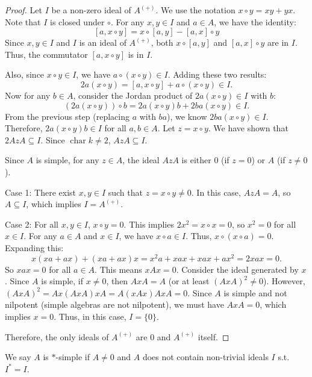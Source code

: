 \documentclass{article}
\begin{document}
\begin{proof} 
Let $ I $ be a non-zero ideal of $ A^{(+)} $. We use the notation $ x \circ y = xy + yx $. Note that $ I $ is closed under $\circ$.
For any $ x,y \in I $ and $ a \in A $, we have the identity:
\[
[a, x \circ y] = x \circ [a, y] - [a, x] \circ y
\]
Since $ x, y \in I $ and $ I $ is an ideal of $ A^{(+)} $, both $ x \circ [a, y] $ and $ [a, x] \circ y $ are in $ I $. Thus, the commutator $ [a, x \circ y] $ is in $ I $.

Also, since $ x \circ y \in I $, we have $ a \circ (x \circ y) \in I $. Adding these two results:
\[
2a(x \circ y) = [a, x \circ y] + a \circ (x \circ y) \in I.
\]
Now for any $ b \in A $, consider the Jordan product of $ 2a(x \circ y) \in I $ with $ b $:
\[
(2a(x \circ y)) \circ b = 2a(x \circ y)b + 2b a (x \circ y) \in I.
\]
From the previous step (replacing $ a $ with $ ba $), we know $ 2ba(x \circ y) \in I $.
Therefore, $ 2a(x \circ y)b \in I $ for all $ a, b \in A $.
Let $ z = x \circ y $. We have shown that $ 2 A z A \subseteq I $. Since $ \operatorname{char} k \neq 2 $, $ A z A \subseteq I $.

Since $ A $ is simple, for any $ z \in A $, the ideal $ A z A $ is either $ 0 $ (if $ z=0 $) or $ A $ (if $ z \neq 0 $).

Case 1: There exist $ x, y \in I $ such that $ z = x \circ y \neq 0 $.
In this case, $ A z A = A $, so $ A \subseteq I $, which implies $ I = A^{(+)} $.

Case 2: For all $ x, y \in I $, $ x \circ y = 0 $.
This implies $ 2x^2 = x \circ x = 0 $, so $ x^2 = 0 $ for all $ x \in I $.
For any $ a \in A $ and $ x \in I $, we have $ x \circ a \in I $. Thus, $ x \circ (x \circ a) = 0 $.
Expanding this:
\[
x(xa+ax) + (xa+ax)x = x^2 a + xax + xax + ax^2 = 2xax = 0.
\]
So $ xax = 0 $ for all $ a \in A $. This means $ xAx = 0 $.
Consider the ideal generated by $ x $. Since $ A $ is simple, if $ x \neq 0 $, then $ AxA = A $ (or at least $ (AxA)^2 \neq 0 $).
However, $ (AxA)^2 = Ax(AxA)x A = A(xAx)AxA = 0 $. Since $ A $ is simple and not nilpotent (simple algebras are not nilpotent), we must have $ AxA = 0 $, which implies $ x = 0 $.
Thus, in this case, $ I = \{0\} $.

Therefore, the only ideals of $ A^{(+)} $ are $ 0 $ and $ A^{(+)} $ itself.
\end{proof}

\begin{definition} 
We say $ A $ is $ * $-simple if $ A \neq 0 $ and $ A$ does not contain non-trivial ideals $ I $ s.t. $ I^*=I $.
\end{definition}
\end{document}
